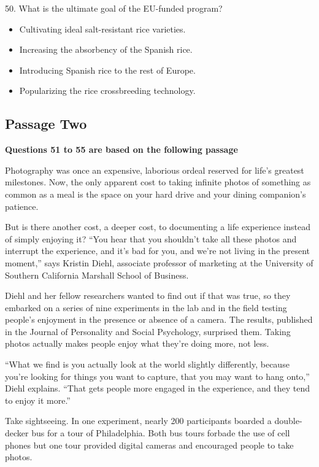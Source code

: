 \documentclass[UTF8,11pt]{ctexart}
\begin{document}
50. What is the ultimate goal of the EU-funded program?


\begin{itemize}[leftmargin=2em,itemsep=.2em,topsep=.4em]\item[A.] Cultivating ideal salt-resistant rice varieties.
\item[B.] Increasing the absorbency of the Spanish rice.
\item[C.] Introducing Spanish rice to the rest of Europe.
\item[D.] Popularizing the rice crossbreeding technology.
\end{itemize}

\subsection*{\textbf{Passage Two}}


\textbf{Questions 51 to 55 are based on the following passage}


Photography was once an expensive, laborious ordeal reserved for life’s greatest milestones. Now, the only apparent cost to taking infinite photos of something as common as a meal is the space on your hard drive and your dining companion’s patience.


But is there another cost, a deeper cost, to documenting a life experience instead of simply enjoying it? “You hear that you shouldn’t take all these photos and interrupt the experience, and it’s bad for you, and we’re not living in the present moment,” says Kristin Diehl, associate professor of marketing at the University of Southern California Marshall School of Business.


Diehl and her fellow researchers wanted to find out if that was true, so they embarked on a series of nine experiments in the lab and in the field testing people’s enjoyment in the presence or absence of a camera. The results, published in the Journal of Personality and Social Psychology, surprised them. Taking photos actually makes people enjoy what they’re doing more, not less.


“What we find is you actually look at the world slightly differently, because you’re looking for things you want to capture, that you may want to hang onto,” Diehl explains. “That gets people more engaged in the experience, and they tend to enjoy it more.”


Take sightseeing. In one experiment, nearly 200 participants boarded a double-decker bus for a tour of Philadelphia. Both bus tours forbade the use of cell phones but one tour provided digital cameras and encouraged people to take photos.
\end{document}
